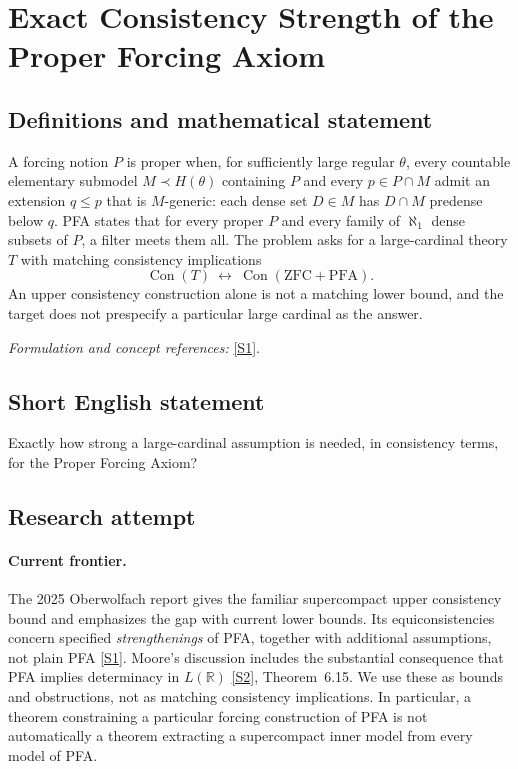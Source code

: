 \documentclass[11pt,a4paper]{article}
\newcommand{\R}{\mathbb{R}}
\newcommand{\sref}[2]{\hyperlink{source:#1:#2}{[S#2]}}
\newif\ifshowcatalogue
\newcommand{\cataloguescope}[1]{\ifshowcatalogue
 \paragraph{Exact scope in the supplied catalogue.}
 \begin{quote}\small #1\end{quote}\fi}
\numberwithin{equation}{section}
\begin{document}
\setcounter{section}{0}
\clearpage
\section*{\texorpdfstring{Exact Consistency Strength of the Proper Forcing Axiom}{Exact Consistency Strength of the Proper Forcing Axiom}}\label{statement}
\subsection{Definitions and mathematical statement}
A forcing notion $P$ is proper when, for sufficiently large regular $\theta$, every countable elementary submodel $M\prec H(\theta)$ containing $P$ and every $p\in P\cap M$ admit an extension $q\le p$ that is $M$-generic: each dense set $D\in M$ has $D\cap M$ predense below $q$. PFA states that for every proper $P$ and every family of $\aleph_1$ dense subsets of $P$, a filter meets them all. The problem asks for a large-cardinal theory $T$ with matching consistency implications
\[
 \operatorname{Con}(T)\ \longleftrightarrow\ \operatorname{Con}(\mathrm{ZFC}+\mathrm{PFA}).
\]
An upper consistency construction alone is not a matching lower bound, and the target does not prespecify a particular large cardinal as the answer.
\par\smallskip\textit{Formulation and concept references:} \sref{statement}{1}.
\cataloguescope{Determine the exact large-cardinal consistency strength of ZFC plus the Proper Forcing Axiom (PFA): identify its equiconsistency level by matching upper and lower consistency bounds.}
\subsection{Short English statement}
Exactly how strong a large-cardinal assumption is needed, in consistency terms, for the Proper Forcing Axiom?
\subsection{Research attempt}

\paragraph{Current frontier.}
The 2025 Oberwolfach report gives the familiar supercompact upper consistency bound and emphasizes the gap with current lower bounds. Its equiconsistencies concern specified \emph{strengthenings} of PFA, together with additional assumptions, not plain PFA \sref{statement}{1}. Moore's discussion includes the substantial consequence that PFA implies determinacy in $L(\R)$ \sref{statement}{2}, Theorem~6.15. We use these as bounds and obstructions, not as matching consistency implications. In particular, a theorem constraining a particular forcing construction of PFA is not automatically a theorem extracting a supercompact inner model from every model of PFA.
\end{document}
